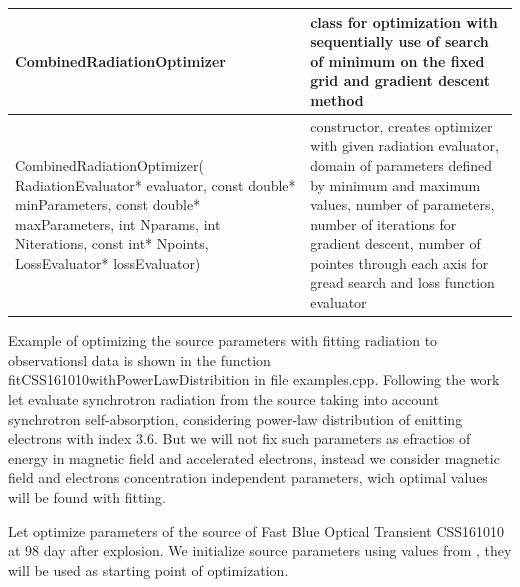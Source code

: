 \begin{small}
\begin{xtabular}{|p{0.41\textwidth}|p{0.59\textwidth}|}
		\hline
		\textbf{CombinedRadiationOptimizer} & class for optimization with sequentially use of search of minimum on the fixed grid and gradient descent method\\
		\hline
		CombinedRadiationOptimizer( RadiationEvaluator* evaluator, const double* minParameters, const double* maxParameters, int Nparams, int Niterations, const int* Npoints, LossEvaluator* lossEvaluator) & constructor, creates optimizer with given radiation evaluator, domain of parameters defined by minimum and maximum values, number of parameters, number of iterations for gradient descent, number of pointes through each axis for gread search and loss function evaluator\\
		\hline
	\end{xtabular}
\end{small}

Example of optimizing the source parameters with fitting radiation to observationsl data is shown in the function fitCSS161010withPowerLawDistribition in file examples.cpp. Following the work \cite{Coppejans2020} let evaluate synchrotron radiation from the source taking into account synchrotron self-absorption, considering power-law distribution of enitting electrons with index 3.6. But we will not fix such parameters as efractios of energy in magnetic field and accelerated electrons, instead we consider magnetic field and electrons concentration independent parameters, wich optimal values will be found with fitting.

Let optimize parameters of the source of Fast Blue Optical Transient CSS161010 at 98 day after explosion. We initialize source parameters using values from \cite{Coppejans2020}, they will be used as starting point of optimization.


